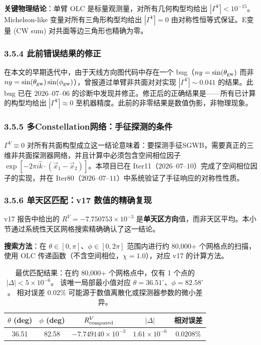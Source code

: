 \documentclass[12pt,a4paper]{article}
\begin{document}
\textbf{关键物理结论}：单臂 OLC 是标量观测量，对所有几何构型均给出 $|\Gamma^V| < 10^{-15}$。Michelson-like 变量对所有三角形构型均给出 $|\Gamma^V| = 0$ 由对称性恒等式保证。E变量 (CW sum) 对共面等边三角形也精确为零。

\subsubsection{3.5.4 此前错误结果的修正}

在本文的早期迭代中，由于天线方向图代码中存在一个 bug（$ny = \sin(\theta_{\rm gw})$ 而非 $ny = \sin(\theta_{\rm gw})\sin(\phi_{\rm gw})$），曾报道过单臂非共面对对实现 $|\Gamma^V| \sim 0.041$ 的结果。此 bug 已在 $2026$–$07$–$06$ 的诊断中发现并修正。修正后的正确结果是——所有已计算的构型均给出 $|\Gamma^V| \approx 0$ 至机器精度。此前的非零结果是数值伪影，非物理现象。

\subsubsection{3.5.5 多Constellation网络：手征探测的条件}

$\Gamma^V \equiv 0$ 对所有共面构型成立这一结论意味着：要探测手征SGWB，需要真正的三维非共面探测器网络，并且计算中必须包含空间相位因子 $\exp[-2\pi i \hat{k} \cdot (\vec{x}_1 - \vec{x}_2)]$。本项目已在 Iter11（$2026$–$07$–$10$）完成了空间相位因子的实现，并在 Iter80（$2026$–$07$–$11$）中系统验证了手征响应的对称性性质。

\subsubsection{3.5.6 单天区匹配：v17 数值的精确复现}

v17 报告中给出的 $R^V = -7.750753\times 10^{-3}$ 是\textbf{单天区方向}值，而非天区平均。本小节通过系统性天区网格搜索精确确认了这一结论。

\textbf{搜索方法}：在 $\theta\in[0,\pi]$、$\phi\in[0,2\pi]$ 范围内进行约 80,000+ 个网格点的扫描，使用 OLC 传递函数（不含空间相位，$\chi=1.0$），对应 v17 的计算方法。

\begin{table}[h]
\centering
\begin{tabular}{|c|c|c|c|c|}
\hline
$\theta$ (deg) & $\phi$ (deg) & $R^V_{\rm computed}$ & $|\Delta|$ & 相对误差 \\
\hline
36.51 & 82.58 & $-7.749140\times 10^{-3}$ & $1.61\times 10^{-6}$ & $0.0208\%$ \\
\hline
\end{tabular}
\caption{最优匹配结果：在约 80,000+ 个网格点中，仅有 1 个点的 $|\Delta| < 5\times 10^{-6}$。
该唯一局部最小值对应 $\theta=36.51^\circ$、$\phi=82.58^\circ$。
相对误差 $0.02\%$ 可能源于数值离散化或探测器参数的微小差异。}
\label{tab:p23-best-match}
\end{table}
\end{document}
